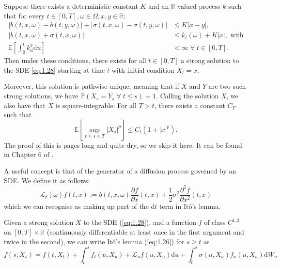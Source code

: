 \begin{theorem}\label{thm:1.6.1}
    Suppose there exists a deterministic constant $K$ and an $\mathbb{R}$-valued process
    $k$ such that for every $t\in[0,T],\omega\in\Omega,x,y\in\mathbb{R}$:
    \begin{align}
        |b(t,x,\omega)-b(t,y,\omega)|+|\sigma(t,x,\omega)-\sigma(t,y,\omega)|&\leq K|x-y|,\\
        |b(t,x,\omega)+\sigma(t,x,\omega)|&\leq k_t(\omega)+K|x|,\textrm{ with}\\
        \mathbb{E}\left[\int_0^tk_u^2\mathrm du\right]&<\infty\;\forall\;t\in[0,T].
    \end{align}
    Then under these conditions, there exists for all $t\in[0,T]$ a strong solution 
    to the SDE \ref{eq:1.28} starting at time $t$ with initial condition $X_t=x$.
    
    Moreover, this solution is pathwise unique, meaning that if $X$ and $Y$ are two
    such strong solutions, we have $\mathbb{P}(X_s=Y_s\;\forall\;t\leq s)=1.$ Calling 
    the solution $X$, we also have that $X$ is square-integrable: For all $T>t$, there 
    exists a constant $C_T$ such that
    \begin{equation}
        \mathbb{E}\left[\sup_{t\leq s\leq T}|X_s|^p\right]\leq C_t(1+|x|^p).
    \end{equation}
    The proof of this is pages long and quite dry, so we skip it here. It can be found
    in Chapter 6 of \cite{Krylov}.
\end{theorem}

\begin{definition}
    A useful concept is that of the generator of a diffusion process governed by 
    an SDE. We define it as follows:
    \begin{equation}
        \mathcal{L}_t(\omega)f(t,x):=b(t,x,\omega)\frac{\partial f}{\partial x}(t,x)+\frac{1}{2}\sigma^2\frac{\partial^2f}{\partial x^2}(t,x)
    \end{equation}
    which we can recognise as making up part of the $\mathrm dt$ term in It\^{o}'s lemma.
\end{definition}

\begin{theorem}
    Given a strong solution $X$ to the SDE (\ref{eq:1.28}), and a function $f$ of 
    class $C^{1,2}$ on $[0,T]\times\mathbb{R}$ (continuously differentiable at least 
    once in the first argument and twice in the second), we can write It\^{o}'s lemma 
    (\ref{eq:1.26}) for $s\geq t$ as 
    \begin{equation}\label{eq:1.30}
        f(s,X_s)=f(t,X_t)+\int_t^sf_t(u,X_u)+\mathcal{L}_uf(u,X_u)\mathrm du + \int_t^s\sigma(u,X_u)f_x(u,X_u)\mathrm dW_u
    \end{equation}
\end{theorem}

